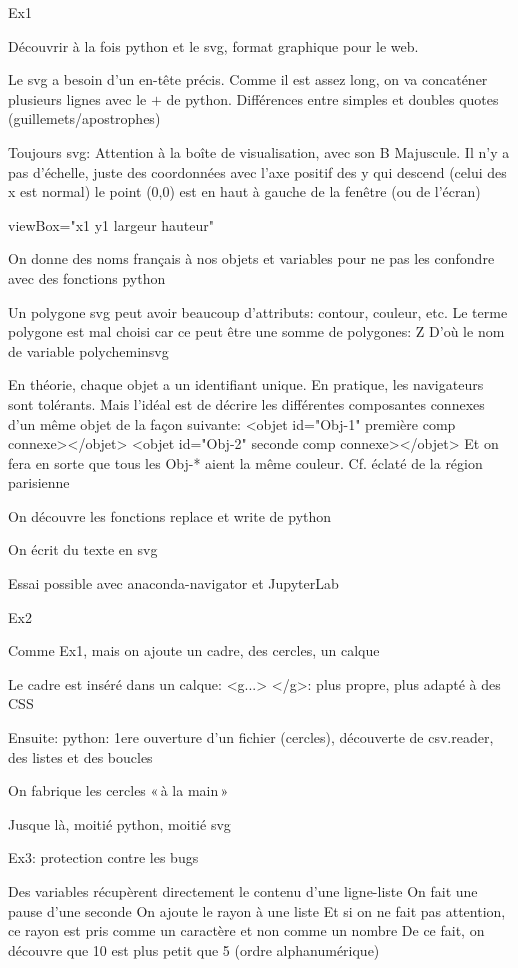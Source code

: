 Ex1

Découvrir à la fois python et le svg, format graphique pour le web.

Le svg a besoin d'un en-tête précis. 
Comme il est assez long, on va concaténer plusieurs lignes avec le $+$ de python.
Différences entre simples et doubles quotes (guillemets/apostrophes)

Toujours svg: Attention à la boîte de visualisation, avec son B Majuscule.
Il n'y a pas d'échelle, juste des coordonnées avec l'axe positif des y qui descend (celui des x est normal)
le point (0,0) est en haut à gauche de la fenêtre (ou de l'écran)

viewBox="x1 y1 largeur hauteur" 

On donne des noms français à nos objets et variables pour ne pas les confondre avec des fonctions python

Un polygone svg peut avoir beaucoup d'attributs: contour, couleur, etc.
Le terme polygone est mal choisi car ce peut être une somme de polygones: Z
D'où le nom de variable polycheminsvg

En théorie, chaque objet a un identifiant unique. 
En pratique, les navigateurs sont tolérants.
Mais l'idéal est de décrire les différentes composantes connexes d'un même objet de la façon suivante:
<objet id="Obj-1" première comp connexe></objet>
<objet id="Obj-2" seconde comp connexe></objet>
Et on fera en sorte que tous les Obj-* aient la même couleur.
Cf. éclaté de la région parisienne

On découvre les fonctions replace et write de python

On écrit du texte en svg

Essai possible avec anaconda-navigator et JupyterLab

Ex2

Comme Ex1, mais  on ajoute un cadre, des cercles, un calque

Le cadre est inséré dans un calque: <g...> </g>: plus propre, plus adapté à des CSS

Ensuite: python: 1ere ouverture d'un fichier (cercles), découverte  de csv.reader, des listes et des boucles

On fabrique les cercles «\,à la main\,»

Jusque là, moitié python, moitié svg

Ex3: protection contre les bugs

Des variables récupèrent directement le contenu d'une ligne-liste
On fait une pause d'une seconde
On ajoute le rayon à une liste
Et si on ne fait pas attention, ce rayon est pris comme un caractère et non comme un nombre
De ce fait, on découvre que 10 est plus petit que 5 (ordre alphanumérique)

